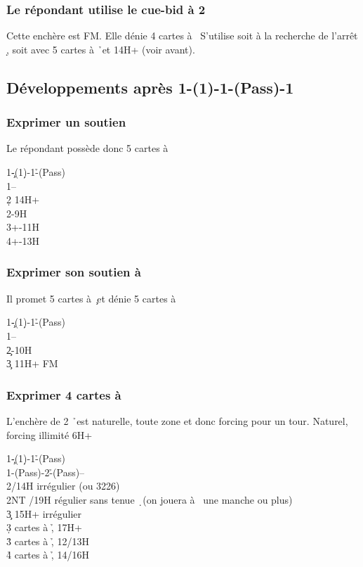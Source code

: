 \documentclass[a4paper]{article}
\begin{document}
\subsubsection{Le répondant utilise le cue-bid à 2 \pdfd}

Cette enchère est FM. Elle dénie 4 cartes à \s\ 
S’utilise soit à la recherche de l’arrêt \d , soit avec 5 cartes à \h\ et 14H+ (voir avant).

\subsection{Développements après 1\pdfc-(1\pdfd)-1\pdfh-(Pass)-1\pdfs}

\subsubsection{Exprimer un soutien \pdfs}

Le répondant possède donc 5 cartes à \s 

\begin{bidtable}
1\c-(1\d)-1\h-(Pass)\\
1\s--\\
2\d \> 14H+\\
2\s {}-9H\\
3\s {}+-11H\\
4\s {}+-13H
\end{bidtable}

\subsubsection{Exprimer son soutien à \pdfc}

Il promet 5 cartes à \c\ et dénie 5 cartes à \s 

\begin{bidtable}
1\c-(1\d)-1\h-(Pass)\\
1\s--\\
2\c {}-10H\\
3\c \> 11H+ FM
\end{bidtable}

\subsubsection{Exprimer 4 cartes à \pdfh}

L’enchère de 2 \h\ est naturelle, toute zone et donc forcing pour un tour.
Naturel, forcing illimité 6H+

\begin{bidtable}
1\c-(1\d)-1\h-(Pass)\\
1\s-(Pass)-2\h-(Pass)--\\
2\s {}/14H irrégulier (ou 3226)\\
2NT /19H régulier sans tenue \d\ (on jouera à \s\ une manche ou plus)\\
3\c \> 15H+ irrégulier\\
3\d {} cartes à \h , 17H+\\
3\h {} cartes à \h , 12/13H\\
4\h \> 4 cartes à \h , 14/16H
\end{bidtable}
\end{document}
